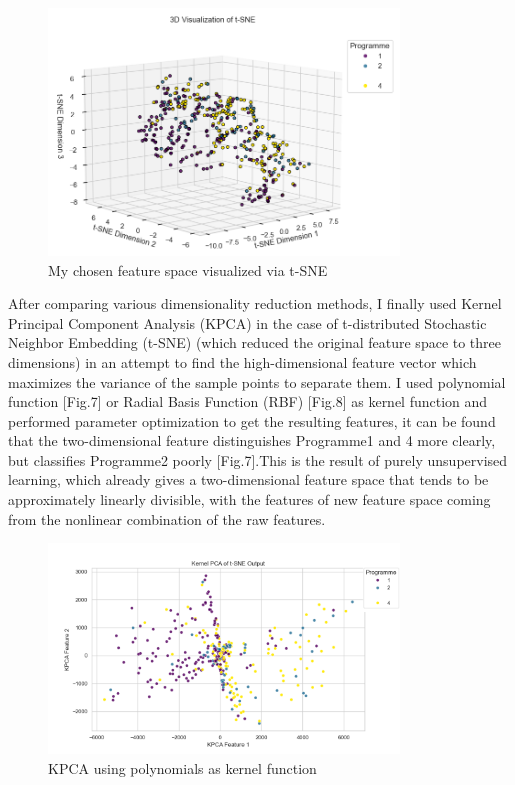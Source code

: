 \documentclass[journal]{IEEEtai}
\begin{document}
\begin{figure}[htbp]
	\centerline{\includegraphics[width=22pc]{tsne_3_dazim=230_mod.png}}
	\caption{My chosen feature space visualized via t-SNE}
\end{figure}

After comparing various dimensionality reduction methods, I finally used Kernel Principal Component Analysis (KPCA) in the case of t-distributed Stochastic Neighbor Embedding (t-SNE) (which reduced the original feature space to three dimensions) in an attempt to find the high-dimensional feature vector which maximizes the variance of the sample points to separate them. I used polynomial function [Fig.7] or Radial Basis Function (RBF) [Fig.8] as kernel function and performed parameter optimization to get the resulting features, it can be found that the two-dimensional feature distinguishes Programme1 and 4 more clearly, but classifies Programme2 poorly [Fig.7].This is the result of purely unsupervised learning, which already gives a two-dimensional feature space that tends to be approximately linearly divisible, with the features of new feature space coming from the nonlinear combination of the raw features.

\begin{figure}[htbp]
	\centerline{\includegraphics[width=22pc]{kpca_after_tnse2d_poly_mod.png}}
	\caption{KPCA using polynomials as kernel function}
\end{figure}
\end{document}
